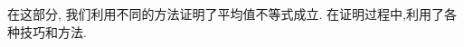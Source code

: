 在这部分, 我们利用不同的方法证明了平均值不等式成立. 在证明过程中,利用了各种技巧和方法.
\begin{comment}

  \section*{习 题 1}
$\square$ 设 $a, b, c>0, a b c=1$. 求证：
$$
\frac{1}{a}+\frac{1}{b}+\frac{1}{c} \geqslant \sqrt{a}+\sqrt{b}+\sqrt{c}
$$

22 设 $a, b, c \geqslant 0, a+b+c>0$, 求证: $\frac{(a+b)^{3}(b+c)^{2}(c+a)}{(a+b+c)^{6}} \leqslant \frac{4}{27}$, 并指\\
出等号成立的条件.

3 已知 $0<a, b, c<1$, 并且 $a b+b c+c a=1$. 证明:
$$
\frac{a}{1-a^{2}}+\frac{b}{1-b^{2}}+\frac{c}{1-c^{2}} \geqslant \frac{3 \sqrt{3}}{2}
$$

4设 $a, b, c, d \in \mathbf{R}_{+}$满足 $a b c d=1, a+b+c+d>\frac{a}{b}+\frac{b}{c}+\frac{c}{d}+\frac{d}{a}$.

求证: $a+b+c+d<\frac{b}{a}+\frac{c}{b}+\frac{d}{c}+\frac{a}{d}$.

5 设 $a_{i}>0,1 \leqslant i \leqslant n$. 求证: $\sum_{i=1}^{n} \frac{a_{i}^{3}+a_{i+1}^{3}}{a_{i}^{2}+a_{i} a_{i+1}+a_{i+1}^{2}} \geqslant \frac{2}{3} \sum_{i=1}^{n} a_{i}$, 其中, $a_{n+1}=$ $a_{1}$.

6 设 $a_{1}, a_{2}, \cdots, a_{n}>0$ 且 $a_{1}+a_{2}+\cdots+a_{n}=1$. 求证:
$$
\left(\frac{1}{a_{1}^{2}}-1\right)\left(\frac{1}{a_{2}^{2}}-1\right) \cdots\left(\frac{1}{a_{n}^{2}}-1\right) \geqslant\left(n^{2}-1\right)^{n}
$$

7 设 $a, b, c, d>0$, 满足 $a^{2}+b^{2}+c^{2}+d^{2}=1$. 求证:
$$
a+b+c+d+\frac{1}{a b c d} \geqslant 18
$$

8 设 $x_{i} \geqslant 0,1 \leqslant i \leqslant n, n \geqslant 3$ 满足 $x_{1}+\cdots+x_{n}=1$, 求证:
$$
\frac{3}{4} \leqslant \frac{x_{1}^{2}+x_{2}+\cdots+x_{n-1}+x_{n}}{x_{1}+x_{2}+\cdots+x_{n-1}+x_{n}^{2}} \leqslant \frac{4}{3}
$$

9 设 $x_{1}, x_{2}, \cdots, x_{n}>0$, 且 $x_{1} x_{2} \cdots x_{n}=1$. 求证:
$$
\frac{1}{x_{1}\left(1+x_{1}\right)}+\frac{1}{x_{2}\left(1+x_{2}\right)}+\cdots+\frac{1}{x_{n}\left(1+x_{n}\right)} \geqslant \frac{n}{2}
$$

10 设 $a, b, c>0$ 且 $a^{2}+b^{2}+c^{2}+(a+b+c)^{2} \leqslant 4$. 求证:
$$
\frac{a b+1}{(a+b)^{2}}+\frac{b c+1}{(b+c)^{2}}+\frac{c a+1}{(c+a)^{2}} \geqslant 3
$$

11 已知 $a 、 b 、 c$ 为正实数, 且 $a b c=8$, 求证:
$$
\frac{a^{2}}{\sqrt{\left(1+a^{3}\right)\left(1+b^{3}\right)}}+\frac{b^{2}}{\sqrt{\left(1+b^{3}\right)\left(1+c^{3}\right)}}+\frac{c^{2}}{\sqrt{\left(1+c^{3}\right)\left(1+a^{3}\right)}} \geqslant \frac{4}{3}
$$


\end{comment}
